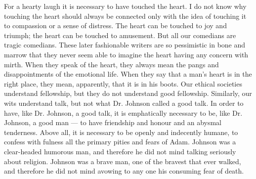 For a hearty laugh it is necessary to have touched the heart. I do not know why touching the heart should always be connected only with the idea of touching it to compassion or a sense of distress. The heart can be touched to joy and triumph; the heart can be touched to amusement. But all our comedians are tragic comedians. These later fashionable writers are so pessimistic in bone and marrow that they never seem able to imagine the heart having any concern with mirth. When they speak of the heart, they always mean the pangs and disappointments of the emotional life. When they say that a man’s heart is in the right place, they mean, apparently, that it is in his boots. Our ethical societies understand fellowship, but they do not understand good fellowship. Similarly, our wits understand talk, but not what Dr. Johnson called a good talk. In order to have, like Dr. Johnson, a good talk, it is emphatically necessary to be, like Dr. Johnson, a good man — to have friendship and honour and an abysmal tenderness. Above all, it is necessary to be openly and indecently humane, to confess with fulness all the primary pities and fears of Adam. Johnson was a clear-headed humorous man, and therefore he did not mind talking seriously about religion. Johnson was a brave man, one of the bravest that ever walked, and therefore he did not mind avowing to any one his consuming fear of death.

